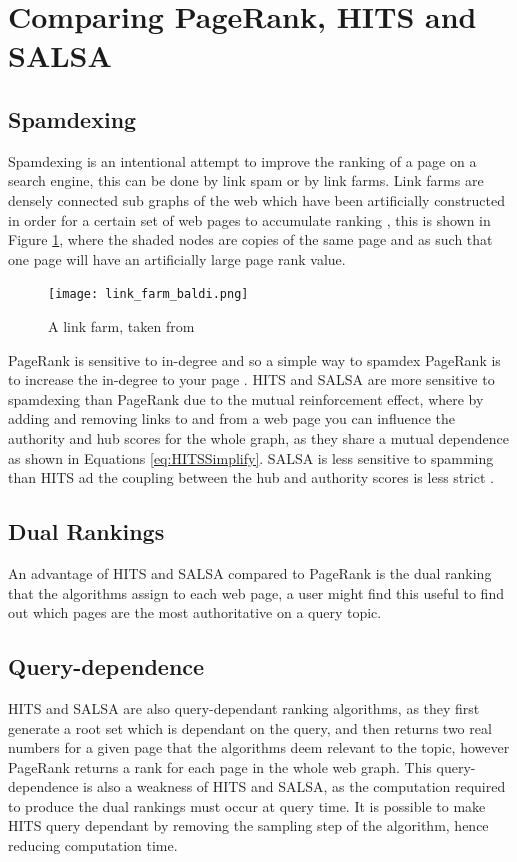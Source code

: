 \documentclass[11pt]{report}
\begin{document}
{\section{Comparing PageRank, HITS and SALSA} \label{sec:compare}
\subsection{Spamdexing}
Spamdexing is an intentional attempt to improve the ranking of a page on a search engine, this can be done by link spam or by link farms. Link farms are densely connected sub graphs of the web which have been artificially constructed in order for a certain set of web pages to accumulate ranking \cite{baldi2003modeling}, this is shown in Figure \ref{fig:link farm}, where the shaded nodes are copies of the same page and as such that one page will have an artificially large page rank value. 

\begin{figure}[h!]
\centering
\texttt{[image: link\_farm\_baldi.png]}
\caption{A link farm, taken from \cite{baldi2003modeling}}
\label{fig:link farm}
\end{figure}

PageRank is sensitive to in-degree and so a simple way to spamdex PageRank is to increase the in-degree to your page \cite{bonato}. HITS and SALSA are more sensitive to spamdexing than PageRank due to the mutual reinforcement effect, where by adding and removing links to and from a web page you can influence the authority and hub scores for the whole graph, as they share a mutual dependence as shown in Equations \eqref{eq:HITSSimplify}. SALSA is less sensitive to spamming than HITS ad the coupling between the hub and authority scores is less strict \cite{lempel2000stochastic}. 

\subsection{Dual Rankings}
An advantage of HITS and SALSA compared to PageRank is the dual ranking that the algorithms assign to each web page, a user might find this useful to find out which pages are the most authoritative on a query topic.

\subsection{Query-dependence}
HITS and SALSA are also query-dependant ranking algorithms, as they first generate a root set which is dependant on the query, and then returns two real numbers for a given page that the algorithms deem relevant to the topic, however PageRank returns a rank for each page in the whole web graph. This query-dependence is also a weakness of HITS and SALSA, as the computation required to produce the dual rankings must occur at query time. It is possible to make HITS query dependant by removing the sampling step of the algorithm, hence reducing computation time. 

}
\end{document}
